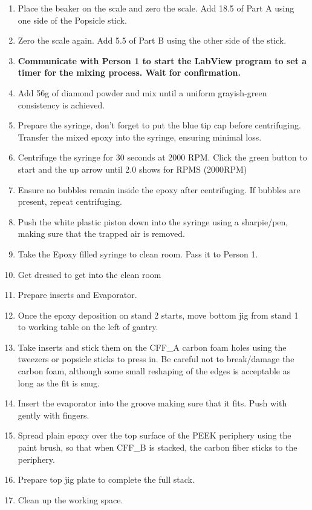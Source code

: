 \documentclass[12pt]{cornelltfpxsop}
\begin{document}
\begin{paracol}{2}
\begin{enumerate}
        \item Place the beaker on the scale and zero the scale. Add 18.5 of Part A using one side of the Popsicle stick.
        \item Zero the scale again. Add 5.5 of Part B using the other side of the stick.
        \item \textbf{Communicate with Person 1 to start the LabView program to set a timer for the mixing process. Wait for confirmation.}       
        \item Add 56g of diamond powder and mix until a uniform grayish-green\\ consistency is achieved.
        \item Prepare the syringe, don't forget to put the blue tip cap before centrifuging. Transfer the mixed epoxy into the syringe, ensuring minimal loss.
        \item Centrifuge the syringe for 30 seconds at 2000 RPM. Click the green button to start and the up arrow until 2.0 shows for RPMS (2000RPM)
        \item Ensure no bubbles remain inside the epoxy after centrifuging. If bubbles are present, repeat centrifuging. 
        \item Push the white plastic piston down into the syringe using a sharpie/pen, making sure that the trapped air is removed. 
        \item Take the Epoxy filled syringe to clean room. Pass it to Person 1.
        \item Get dressed to get into the clean room   
        \item Prepare inserts and Evaporator.
        \item Once the epoxy deposition on stand 2 starts, move bottom jig from stand 1 to working table on the left of gantry. 
        \item Take inserts and stick them on the  CFF\_A carbon foam holes using the tweezers or popsicle sticks to press in. Be careful not to break/damage the carbon foam, although some small reshaping of the edges is acceptable as long as the fit is snug.
        \item Insert the evaporator into the groove making sure that it fits. Push with gently with fingers.
        \item Spread plain epoxy over the top surface of the PEEK periphery using the paint brush, so that when CFF\_B is stacked, the carbon fiber sticks to the periphery.  
        \item Prepare top jig plate to complete the full stack.
        \item Clean up the working space.
\switchcolumn %
\end{enumerate}
\end{paracol}
\end{document}
